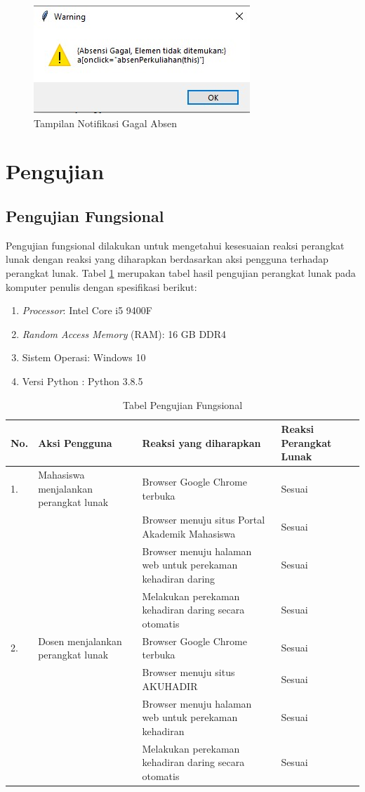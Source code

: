 \begin{figure}[H]
	\centering
	\includegraphics[scale=0.7]{Gambar/gagalAbsen.jpg}
	\caption{Tampilan Notifikasi Gagal Absen} 
	\label{fig:absenGagal}
\end{figure}

\section{Pengujian}
\label{sec:pengujian} 

\subsection{Pengujian Fungsional}
Pengujian fungsional dilakukan untuk mengetahui kesesuaian reaksi perangkat lunak dengan reaksi yang diharapkan berdasarkan aksi pengguna terhadap perangkat lunak. Tabel \ref{tab:fungsi} merupakan tabel hasil pengujian perangkat lunak pada komputer penulis dengan spesifikasi berikut:
\begin{enumerate}
	\item \textit{Processor}: Intel Core i5 9400F
	\item \textit{Random Access Memory} (RAM): 16 GB DDR4
	\item Sistem Operasi: Windows 10
	\item Versi Python : Python 3.8.5
\end{enumerate}

\begin{table}[H]			
	\caption{Tabel Pengujian Fungsional}
	\centering
	\begin{tabular}{|p{0.5cm} |p{4cm} |p{5.5cm}| p{3cm}|} \hline
		No. & Aksi Pengguna & Reaksi yang diharapkan & Reaksi Perangkat Lunak\\ \hline     
		1. 	& Mahasiswa menjalankan perangkat lunak & Browser Google Chrome terbuka & Sesuai\\ \hline 
	 		& &  Browser menuju situs Portal Akademik Mahasiswa & Sesuai\\ \hline 
			& &  Browser menuju halaman web untuk perekaman kehadiran daring & Sesuai\\ \hline 
			& &  Melakukan perekaman kehadiran daring secara otomatis & Sesuai\\ \hline 
		2. & Dosen menjalankan perangkat lunak & Browser Google Chrome terbuka & Sesuai\\ \hline 
		 	& &  Browser menuju situs AKUHADIR & Sesuai\\ \hline
		 	& &  Browser menuju halaman web untuk perekaman kehadiran & Sesuai\\ \hline
		 	& &  Melakukan perekaman kehadiran daring secara otomatis & Sesuai\\ \hline
	\end{tabular}
	\label{tab:fungsi}
\end{table}

